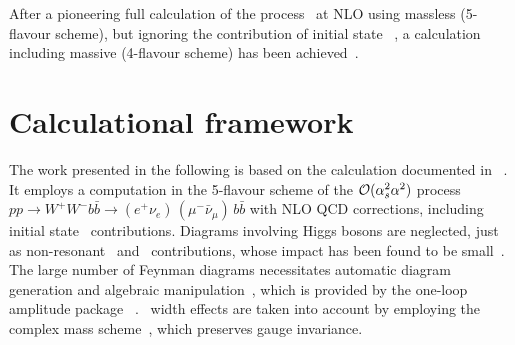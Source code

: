 %
After a pioneering full calculation of the process \ppWWbb\ at \gls{NLO} using massless  (5-flavour scheme), but ignoring the contribution of initial state ~\cite{Denner:2010jp,Denner:2012yc,Bevilacqua:2010qb}, a calculation including massive  (4-flavour scheme) has been achieved~\cite{Frederix:2013gra,Cascioli:2013wga}.
















\section{Calculational framework}
%
The work presented in the following is based on the calculation documented in ~\cite{Heinrich2014}. 
%
It employs a computation in the 5-flavour scheme of the $\mathcal O(\alpha_{s}^2\alpha^2)$ process $pp\to W^+W^-b\bar{b}\to$\newline$(e^+ \nu_e)\,(\mu^- \bar{\nu}_{\mu})\,b\bar{b}$ with \gls{NLO} \gls{QCD} corrections, including initial state \bquark\ contributions. 
%
Diagrams involving Higgs bosons are neglected, just as non-resonant \Wboson\ and \Zboson\ contributions, whose impact has been found to be small~\cite{Denner:2012yc}. 
%
%
The large number of Feynman diagrams necessitates automatic diagram generation and algebraic manipulation~\cite{Nogueira:1991ex,Vermaseren:2000nd, Reiter:2009ts, Cullen:2010jv}, which is provided by the one-loop amplitude package \Gosam~\cite{Cullen:2011ac}. 
%
%
\Tquark\ width effects are taken into account by employing the complex mass scheme~\cite{Denner:2006ic}, which preserves gauge invariance. 
%
